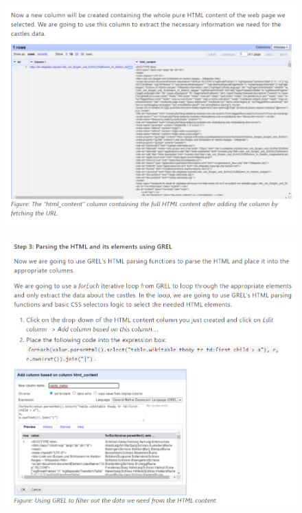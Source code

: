 \begin{figure}[H]
    \includegraphics[width=\linewidth]{./Figures/Appendices/worksheet/54.png}
\end{figure}
\begin{figure}[H]
    \includegraphics[width=\linewidth]{./Figures/Appendices/worksheet/55.png}
\end{figure}
